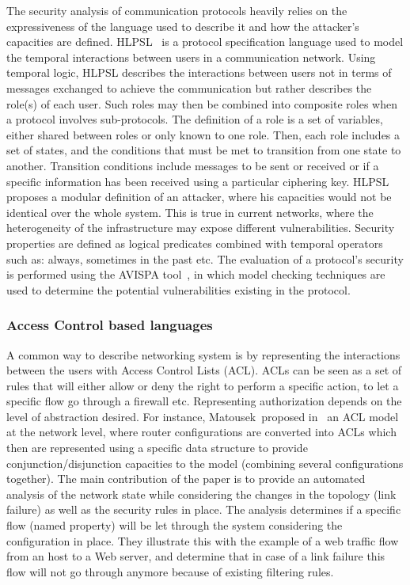 The security analysis of communication protocols heavily relies on the expressiveness of the language used to describe it and how the attacker's capacities are defined. HLPSL~\cite{HLPSL-Chevalier2004} is a protocol specification language used to model the temporal interactions between users in a communication network. Using temporal logic, HLPSL describes the interactions between users not in terms of messages exchanged to achieve the communication but rather describes the role(s) of each user. Such roles may then be combined into composite roles when a protocol involves sub-protocols.
The definition of a role is a set of variables, either shared between roles or only known to one role.
Then, each role includes a set of states, and the conditions that must be met to transition from one state to another. Transition conditions include messages to be sent or received or if a specific information has been received using a particular ciphering key.
HLPSL proposes a modular definition of an attacker, where his capacities would not be identical over the whole system.
This is true in current networks, where the heterogeneity of the infrastructure may expose different vulnerabilities.
Security properties are defined as logical predicates combined with temporal operators such as: always, sometimes in the past etc.
The evaluation of a protocol's security is performed using the AVISPA tool~\cite{avispa}, in which model checking techniques are used to determine the potential vulnerabilities existing in the protocol.

\subsubsection{Access Control based languages}
A common way to describe networking system is by representing the interactions between the users with Access Control Lists (ACL).
ACLs can be seen as a set of rules that will either allow or deny the right to perform a specific action, to let a specific flow go through a firewall etc.
Representing authorization depends on the level of abstraction desired.
For instance, Matousek~\etal proposed in~\cite{Matousek2008} an ACL model at the network level, where router configurations are converted into ACLs which then are represented using a specific data structure to provide conjunction/disjunction capacities to the model (\ie combining several configurations together).
The main contribution of the paper is to provide an automated analysis of the network state while considering the changes in the topology (\ie link failure) as well as the security rules in place.
The analysis determines if a specific flow (named property) will be let through the system considering the configuration in place. They illustrate this with the example of a web traffic flow from an host to a Web server, and determine that in case of a link failure this flow will not go through anymore because of existing filtering rules.

